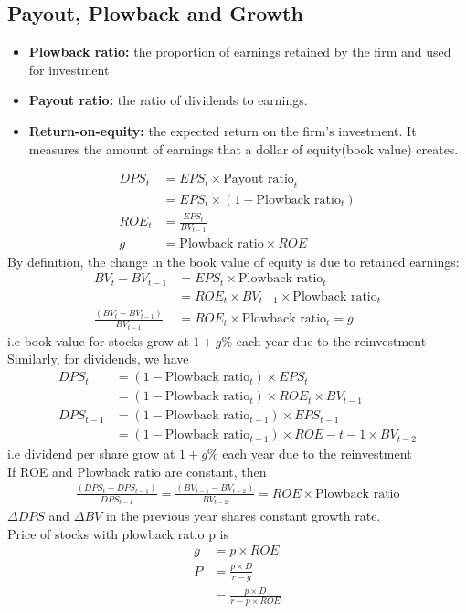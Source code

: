 \documentclass{article}
\theoremstyle{definition}
\theoremstyle{thrm}
\theoremstyle{lma}
\theoremstyle{ppst}
\theoremstyle{crlr}
\begin{document}
\subsection{Payout, Plowback and Growth}
\begin{itemize}
	\item \textbf{Plowback ratio: } the proportion of earnings retained by the firm and used for investment
	\item \textbf{Payout ratio: } the ratio of dividends to earnings. 
	\item \textbf{Return-on-equity: }the expected return on the firm's investment. It measures the amount of earnings that a dollar of equity(book value) creates. 
\end{itemize}

\begin{align*}
	DPS_t &= EPS_t \times \text{Payout ratio}_t \\
	&= EPS_t\times (1-\text{Plowback ratio}_t)\\
	ROE_t &= \frac{EPS_t}{BV_{t-1}}\\
	g &=\text{Plowback ratio}\times ROE
\end{align*}
By definition, the change in the book value of equity is due to retained earnings:
\begin{align*}
	BV_t-BV_{t-1} &= EPS_t\times \text{Plowback ratio}_t \\
	&= ROE_t\times BV_{t-1}\times \text{Plowback ratio}_t\\
	\frac{(BV_t-BV_{t-1})}{BV_{t-1}}&= ROE_t\times \text{Plowback ratio}_t = g
\end{align*}
i.e book value for stocks grow at $1+g\%$ each year due to the reinvestment\\
Similarly, for dividends, we have
\begin{align*}
	DPS_t &= (1-\text{Plowback ratio}_t)\times EPS_t\\
	&= (1-\text{Plowback ratio}_t)\times ROE_t \times BV_{t-1}\\
	DPS_{t-1} &= (1-\text{Plowback ratio}_{t-1})\times EPS_{t-1}\\
	&= (1-\text{Plowback ratio}_{t-1})\times ROE-{t-1}\times BV_{t-2}
\end{align*}
i.e dividend per share grow at $1+g\%$ each year due to the reinvestment\\
If ROE and Plowback ratio are constant, then 
\begin{align*}
	\frac{(DPS_t-DPS_{t-1})}{DPS_{t-1}} = \frac{(BV_{t-1}-BV_{t-2})}{BV_{t-2}} = ROE \times \text{Plowback ratio}
\end{align*}
$\Delta DPS$ and $\Delta BV$ in the previous year shares constant growth rate. \\
Price of stocks with plowback ratio p is
\begin{align*}
	g &= p\times ROE\\
	P &= \frac{p\times D}{r-g}\\
	&=\frac{p\times D}{r-p\times ROE}
\end{align*}
\end{document}
